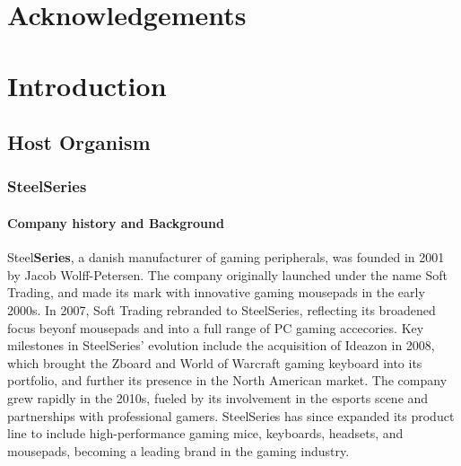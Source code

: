 \documentclass[a4paper,12pt]{report}
\begin{document}
\chapter{Acknowledgements}
\chapter{Introduction}

\section{Host Organism}
\subsection{SteelSeries}
\subsubsection{Company history and Background}
Steel\textbf{Series}, a danish manufacturer of gaming peripherals, was founded in 2001 by Jacob Wolff-Petersen. The company originally launched under the name Soft Trading, and made its mark with innovative gaming mousepads in the early 2000s. In 2007, Soft Trading rebranded to SteelSeries, reflecting its broadened focus beyonf mousepads and into a full range of PC gaming accecories. Key milestones in SteelSeries' evolution include the acquisition of Ideazon in 2008, which brought the Zboard and World of Warcraft gaming keyboard into its portfolio, and further its presence in the North American market.
The company grew rapidly in the 2010s, fueled by its involvement in the esports scene and partnerships with professional gamers. SteelSeries has since expanded its product line to include high-performance gaming mice, keyboards, headsets, and mousepads, becoming a leading brand in the gaming industry.
\end{document}
